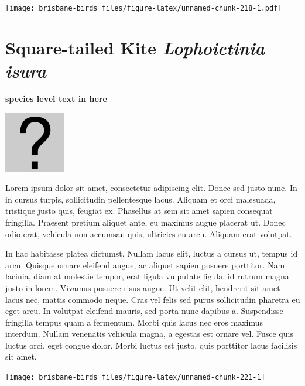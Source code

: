 \documentclass[]{book}
\let\origfigure\figure
\let\endorigfigure\endfigure
\renewenvironment{figure}[1][2] {
  \expandafter\origfigure\expandafter[H]
} {
  \endorigfigure
}
\begin{document}
\begin{figure}
\centering
\texttt{[image: brisbane-birds\_files/figure-latex/unnamed-chunk-218-1.pdf]}
\caption{\label{fig:unnamed-chunk-218}insert figure caption}
\end{figure}

\section{\texorpdfstring{Square-tailed Kite \emph{Lophoictinia
isura}}{Square-tailed Kite Lophoictinia isura}}\label{square-tailed-kite-lophoictinia-isura}

\textbf{species level text in here}

\begin{figure}
\centering
\includegraphics{assets/missing.png}
\caption{No image for species}
\end{figure}

Lorem ipsum dolor sit amet, consectetur adipiscing elit. Donec sed justo
nunc. In in cursus turpis, sollicitudin pellentesque lacus. Aliquam et
orci malesuada, tristique justo quis, feugiat ex. Phasellus at sem sit
amet sapien consequat fringilla. Praesent pretium aliquet ante, eu
maximus augue placerat ut. Donec odio erat, vehicula non accumsan quis,
ultricies eu arcu. Aliquam erat volutpat.

In hac habitasse platea dictumst. Nullam lacus elit, luctus a cursus ut,
tempus id arcu. Quisque ornare eleifend augue, ac aliquet sapien posuere
porttitor. Nam lacinia, diam at molestie tempor, erat ligula vulputate
ligula, id rutrum magna justo in lorem. Vivamus posuere risus augue. Ut
velit elit, hendrerit sit amet lacus nec, mattis commodo neque. Cras vel
felis sed purus sollicitudin pharetra eu eget arcu. In volutpat eleifend
mauris, sed porta nunc dapibus a. Suspendisse fringilla tempus quam a
fermentum. Morbi quis lacus nec eros maximus interdum. Nullam venenatis
vehicula magna, a egestas est ornare vel. Fusce quis luctus orci, eget
congue dolor. Morbi luctus est justo, quis porttitor lacus facilisis sit
amet.

\begin{figure}
\texttt{[image: brisbane-birds\_files/figure-latex/unnamed-chunk-221-1]} \caption{insert figure caption}\label{fig:unnamed-chunk-221}
\end{figure}
\end{document}
